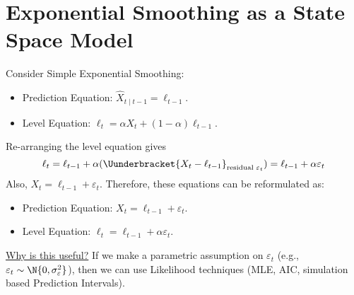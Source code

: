 \section{Exponential Smoothing as a State Space Model}
Consider Simple Exponential Smoothing:
\begin{itemize}
    \item Prediction Equation: $ \hat{X}_{t\mid t-1}=\ell_{t-1} $.
    \item Level Equation: $ \ell_t=\alpha X_t+(1-\alpha)\ell_{t-1} $.
\end{itemize}
Re-arranging the level equation gives
\[ \ell_t=\ell_{t-1}+\alpha(\Uunderbracket{X_t-\ell_{t-1}}_{\text{residual $ \varepsilon_t $}})=\ell_{t-1}+\alpha \varepsilon_t \]
Also, $ X_t=\ell_{t-1}+\varepsilon_t $. Therefore, these equations
can be reformulated as:
\begin{itemize}
    \item Prediction Equation: $ X_t=\ell_{t-1}+\varepsilon_t $.
    \item Level Equation: $ \ell_t=\ell_{t-1}+\alpha \varepsilon_t $.
\end{itemize}
\underline{Why is this useful?} If we make a parametric assumption
on $ \varepsilon_t $ (e.g., $ \varepsilon_t \sim \N{0,\sigma_{\varepsilon}^2} $),
then we can use Likelihood techniques (MLE, AIC, simulation based Prediction Intervals).

